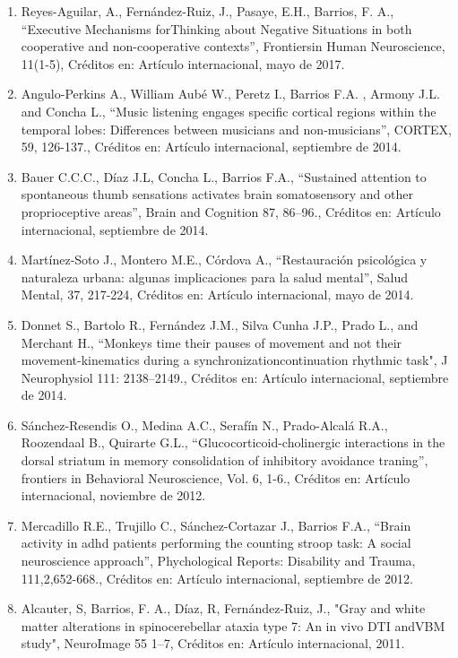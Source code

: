 \documentclass[12pt]{article}
\begin{document}
\begin{enumerate}
\item Reyes-Aguilar, A., Fernández-Ruiz, J., Pasaye, E.H., Barrios, F. A., “Executive Mechanisms forThinking about Negative Situations 
in 
both cooperative and non-cooperative contexts”, Frontiersin Human Neuroscience, 11(1-5), Créditos en: Artículo internacional, mayo de 
2017.

\item Angulo-Perkins A., William Aubé W., Peretz I., Barrios F.A. , Armony J.L. and Concha L., “Music listening engages specific 
cortical 
regions within the temporal lobes: Differences between musicians and non-musicians”, CORTEX, 59, 126-137., Créditos en: Artículo 
internacional, septiembre de 2014.

\item Bauer C.C.C., Díaz J.L, Concha L., Barrios F.A., “Sustained attention to spontaneous thumb sensations activates brain 
somatosensory 
and other proprioceptive areas”, Brain and Cognition 87, 86–96., Créditos en: Artículo internacional, septiembre de 2014.

\item Martínez-Soto J., Montero M.E., Córdova A., “Restauración psicológica y naturaleza urbana: algunas implicaciones para la salud 
mental”, Salud Mental, 37, 217-224, Créditos en: Artículo internacional, mayo de 2014.

\item Donnet S., Bartolo R., Fernández J.M., Silva Cunha J.P., Prado L., and Merchant H., “Monkeys time their pauses of movement and 
not 
their movement-kinematics during a synchronizationcontinuation rhythmic task", J Neurophysiol 111: 2138–2149., Créditos en: Artículo 
internacional, septiembre de 2014.

\item Sánchez-Resendis O., Medina A.C., Serafín N., Prado-Alcalá R.A., Roozendaal B., Quirarte G.L., “Glucocorticoid-cholinergic 
interactions in the dorsal striatum in memory consolidation of inhibitory avoidance traning”, frontiers in Behavioral Neuroscience, 
Vol. 6, 1-6., Créditos en: Artículo internacional, noviembre de 2012.

\item Mercadillo R.E., Trujillo C., Sánchez-Cortazar J., Barrios F.A., “Brain activity in adhd patients performing the counting stroop 
task: A social neuroscience approach”, Phychological Reports: Disability and Trauma, 111,2,652-668., Créditos en: Artículo 
internacional, septiembre de 2012.

\item Alcauter, S, Barrios, F. A., Díaz, R, Fernández-Ruiz, J., "Gray and white matter alterations in spinocerebellar ataxia type 7: An 
in vivo DTI andVBM study", NeuroImage 55 1–7, Créditos en: Artículo internacional, 2011.


\end{enumerate}
\end{document}
